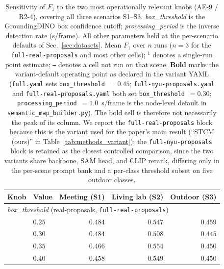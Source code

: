 \begin{table}[t]
\centering
\caption{Sensitivity of $F_1$ to the two most operationally relevant knobs (AE-9 / R2-4), covering all three scenarios S1--S3. \emph{box\_threshold} is the GroundingDINO box confidence cutoff; \emph{processing\_period} is the inverse detection rate (s/frame). All other parameters held at the per-scenario defaults of Sec.~\ref{sec:datasets}. Mean $F_1$ over $n$ runs ($n{=}3$ for the \texttt{full-real-proposals} and most other cells); $^{1}$ denotes a single-run point estimate; \texttt{---} denotes a cell not run on that scene. \textbf{Bold} marks the variant-default operating point as declared in the variant YAML (\texttt{full.yaml} sets \texttt{box\_threshold}~$=0.45$; \texttt{full-nyu-proposals.yaml} and \texttt{full-real-proposals.yaml} both set \texttt{box\_threshold}~$=0.30$; \texttt{processing\_period}~$=1.0$~s/frame is the node-level default in \texttt{semantic\_map\_builder.py}). The bold cell is therefore not necessarily the peak of its column. We report the \texttt{full-real-proposals} block because this is the variant used for the paper's main result (``STCM (ours)'' in Table~\ref{tab:methods_variant}); the \texttt{full-nyu-proposals} block is retained as the closest controlled comparison, since the two variants share backbone, SAM head, and CLIP rerank, differing only in the per-scene prompt bank and a per-class threshold subset on five outdoor classes.}
\label{tab:sensitivity}
\begin{tabular}{l l r r r}
\toprule
Knob & Value & Meeting (S1) & Living lab (S2) & Outdoor (S3) \\
\midrule
\multicolumn{5}{l}{\emph{box\_threshold} (real-proposals, \texttt{full-real-proposals})} \\
& $0.25$           & $0.484$ & $0.547$ & $0.459$ \\
& $\mathbf{0.30}$  & $\mathbf{0.484}$ & $\mathbf{0.508}$ & $\mathbf{0.445}$ \\
& $0.35$           & $0.466$ & $0.554$ & $0.450$ \\
& $0.40$           & $0.458$ & $0.549$ & $0.450$ \\

\end{tabular}
\end{table}
